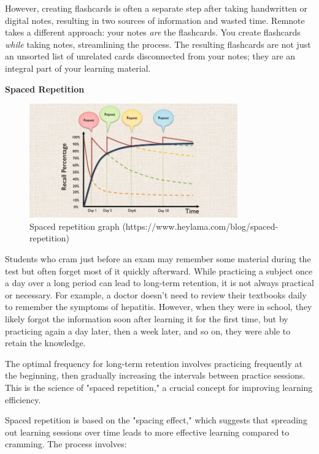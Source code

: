 \documentclass{article}
\begin{document}
However, creating flashcards is often a separate step after taking handwritten or digital notes, resulting in two sources of information and wasted time. Remnote takes a different approach: your notes \textit{are} the flashcards. You create flashcards \textit{while} taking notes, streamlining the process. The resulting flashcards are not just an unsorted list of unrelated cards disconnected from your notes; they are an integral part of your learning material.

\textbf{Spaced Repetition}

\begin{figure}[h]
    \centering
    \includegraphics[width=0.8\textwidth]{images/spaced_repetition_principle.png}
    \caption{Spaced repetition graph (https://www.heylama.com/blog/spaced-repetition)} %
\end{figure}

Students who cram just before an exam may remember some material during the test but often forget most of it quickly afterward. While practicing a subject once a day over a long period can lead to long-term retention, it is not always practical or necessary. For example, a doctor doesn't need to review their textbooks daily to remember the symptoms of hepatitis. However, when they were in school, they likely forgot the information soon after learning it for the first time, but by practicing again a day later, then a week later, and so on, they were able to retain the knowledge.

The optimal frequency for long-term retention involves practicing frequently at the beginning, then gradually increasing the intervals between practice sessions. This is the science of "spaced repetition," a crucial concept for improving learning efficiency.

Spaced repetition is based on the "spacing effect," which suggests that spreading out learning sessions over time leads to more effective learning compared to cramming. The process involves:
\end{document}
